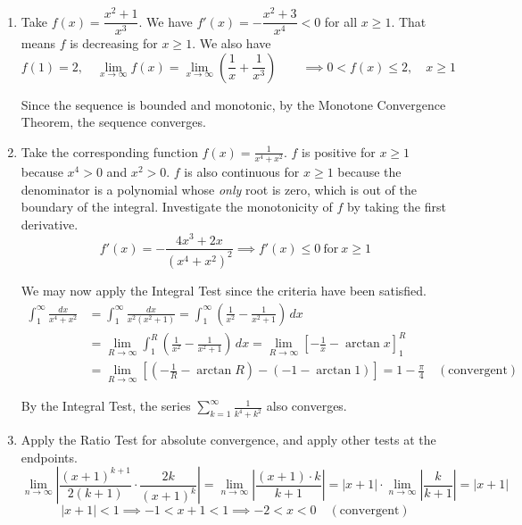 \documentclass[a4paper, 12pt]{article}
\begin{document}
\begin{enumerate}[leftmargin=*,label=\textbf{\arabic*.}]
\begin{enumerate}[leftmargin=*,label=\textbf{\alph*.}]
Let $\displaystyle u=\frac2{\sqrt3}\left(t+\frac12\right)$, then $\displaystyle du=\frac2{\sqrt3}\,dt$.

\begin{align*}\frac{2\sqrt3}3\int\frac{du}{u^2+1}&=\frac{2\sqrt3}3\arctan u+c=\frac{2\sqrt3}3\arctan\left(\frac2{\sqrt3}\left(t+\frac12\right)\right)+c\\[1em]&=\boxed{\frac{2\sqrt3}3\arctan\left(\frac2{\sqrt3}\left(\tan\left(\frac x2\right)+\frac12\right)\right)+C,\quad C\in\mathbb{R}}\end{align*}
\end{enumerate}

\item Take $f(x)=\dfrac{x^2+1}{x^3}$. We have $f'(x)=-\dfrac{x^2+3}{x^4}<0$ for all $x\geq1$. That means $f$ is decreasing for $x\geq1$. We also have
\[f(1)=2,\quad \lim_{x\to\infty}f(x)=\lim_{x\to\infty}\left(\frac1x +\frac1{x^3}\right)\qquad \implies0<f(x)\leq2,\quad x\geq1\]

Since the sequence is bounded and monotonic, by the Monotone Convergence Theorem, the sequence converges.

\item Take the corresponding function $\displaystyle f(x)=\frac1{x^4+x^2}$. $f$ is positive for $x\geq1$ because $x^4>0$ and $x^2>0$. $f$ is also continuous for $x\geq1$ because the denominator is a polynomial whose \textit{only} root is zero, which is out of the boundary of the integral. Investigate the monotonicity of $f$ by taking the first derivative.
\[f'(x)=-\frac{4x^3+2x}{\left(x^4+x^2\right)^2}\implies f'(x)\leq0\:\text{for}\:x\geq1\]

We may now apply the Integral Test since the criteria have been satisfied.
\begin{align*}\int_1^{\infty}\frac{dx}{x^4+x^2}&=\int_1^{\infty}\frac{dx}{x^2\left(x^2+1\right)}=\int_1^{\infty}\left(\frac1{x^2}-\frac1{x^2+1}\right)\,dx\\[1em]&=\lim_{R\to\infty}\int_1^R\left(\frac1{x^2}-\frac1{x^2+1}\right)\,dx=\lim_{R\to\infty}\left[-\frac1x-\arctan x\right]_1^R\\[1em]&=\lim_{R\to\infty}\left[\left(-\frac1R-\arctan R\right)-\left(-1-\arctan1\right)\right]=1-\frac\pi4\quad\left(\text{convergent}\right)\end{align*}

By the Integral Test, the series $\displaystyle\sum_{k=1}^{\infty}\frac1{k^4+k^2}$ also converges.

\item Apply the Ratio Test for absolute convergence, and apply other tests at the endpoints.
\[\lim_{n\to\infty}\left|\frac{(x+1)^{k+1}}{2(k+1)}\cdot\frac{2k}{(x+1)^k}\right|=\lim_{n\to\infty}\left|\frac{(x+1)\cdot k}{k+1}\right|=|x+1|\cdot\lim_{n\to\infty}\left|\frac{k}{k+1}\right|=|x+1|\]
\[|x+1|<1\implies-1<x+1<1\implies-2<x<0\quad(\text{convergent})\]


\end{enumerate}
\end{document}
